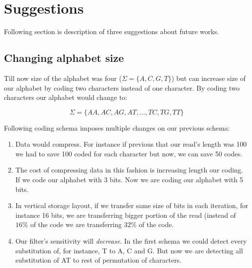 \section{Suggestions}

Following section is description of three suggestions about future works.

\subsection{Changing alphabet size}
Till now size of the alphabet was four ($\Sigma = \{A,C,G,T\}$) but can increase size of our alphabet by coding two characters instead of one character. By coding two characters our alphabet would change to:

\begin{equation}
\nonumber
\Sigma = \{ AA, AC, AG, AT, \dots, TC, TG, TT \}
\end{equation}

Following coding schema imposes multiple changes on our previous schema:

\begin{enumerate}
\item Data would compress. For instance if previous that our read's length was 100 we had to save 100 coded for each character but now, we can save 50 codes.
\item The cost of compressing data in this fashion is increasing length our coding. If we code our alphabet with 3 bits. Now we are coding our alphabet with 5 bits.
\item In vertical storage layout, if we transfer same size of bits in each iteration, for instance 16 bits, we are transferring bigger portion of the read (instead of $16\%$ of the code we are transferring $32\%$ of the code.
\item Our filter's sensitivity will \emph{decrease}. In the first schema we could detect every substitution of, for instance, T to A, C and G. But now we are detecting all substitution of AT to rest of permutation of characters.
\end{enumerate}
 
